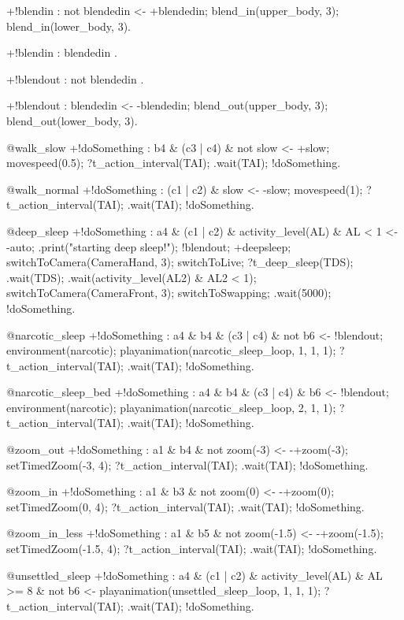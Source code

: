 \documentclass[draft,final]{vutinfth} %
\begin{document}
{+!blendin : not blendedin
    <-  +blendedin;
        blend\_in(upper\_body, 3);
        blend\_in(lower\_body, 3).

+!blendin : blendedin .

+!blendout : not blendedin .

+!blendout : blendedin
    <-  -blendedin;
        blend\_out(upper\_body, 3);
        blend\_out(lower\_body, 3).


@walk\_slow
+!doSomething : b4 \& (c3 | c4) \& not slow
    <-  +slow;
        movespeed(0.5);
        ?t\_action\_interval(TAI);
        .wait(TAI);
        !doSomething.

@walk\_normal
+!doSomething : (c1 | c2) \& slow
    <-  -slow;
        movespeed(1);
        ?t\_action\_interval(TAI);
        .wait(TAI);
        !doSomething.

@deep\_sleep
+!doSomething : a4 \& (c1 | c2) \& activity\_level(AL) \& AL < 1
    <-  -auto;
        .print("starting deep sleep!");
        !blendout;
        +deepsleep;
        switchToCamera(CameraHand, 3);
        switchToLive;
        ?t\_deep\_sleep(TDS);
        .wait(TDS);
        .wait(activity\_level(AL2) \& AL2 < 1);
        switchToCamera(CameraFront, 3);
        switchToSwapping;
        .wait(5000);
        !doSomething.

@narcotic\_sleep
+!doSomething : a4 \& b4 \& (c3 | c4) \& not b6
    <-  !blendout;
        environment(narcotic);
        playanimation(narcotic\_sleep\_loop, 1, 1, 1);
        ?t\_action\_interval(TAI);
        .wait(TAI);
        !doSomething.

@narcotic\_sleep\_bed
+!doSomething : a4 \& b4 \& (c3 | c4) \& b6
    <-  !blendout;
        environment(narcotic);
        playanimation(narcotic\_sleep\_loop, 2, 1, 1);
        ?t\_action\_interval(TAI);
        .wait(TAI);
        !doSomething.

@zoom\_out
+!doSomething : a1 \& b4 \& not zoom(-3)
    <-  -+zoom(-3);
        setTimedZoom(-3, 4);
        ?t\_action\_interval(TAI);
        .wait(TAI);
        !doSomething.

@zoom\_in
+!doSomething : a1 \& b3 \& not zoom(0)
    <-  -+zoom(0);
        setTimedZoom(0, 4);
        ?t\_action\_interval(TAI);
        .wait(TAI);
        !doSomething.

@zoom\_in\_less
+!doSomething : a1 \& b5 \& not zoom(-1.5)
    <-  -+zoom(-1.5);
        setTimedZoom(-1.5, 4);
        ?t\_action\_interval(TAI);
        .wait(TAI);
        !doSomething.

@unsettled\_sleep
+!doSomething : a4 \& (c1 | c2) \& activity\_level(AL) \& AL >= 8 \& not b6
    <-  playanimation(unsettled\_sleep\_loop, 1, 1, 1);
        ?t\_action\_interval(TAI);
        .wait(TAI);
        !doSomething.

}
\end{document}
